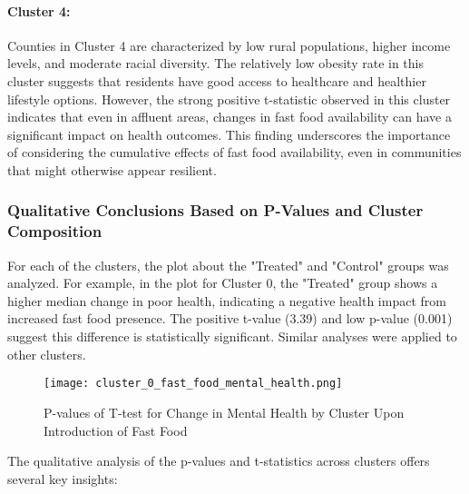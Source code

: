 \documentclass[letterpaper, 11pt]{report}
\begin{document}
\paragraph{Cluster 4:} 
Counties in Cluster 4 are characterized by low rural populations, higher income levels, and moderate racial diversity. The relatively low obesity rate in this cluster suggests that residents have good access to healthcare and healthier lifestyle options. However, the strong positive t-statistic observed in this cluster indicates that even in affluent areas, changes in fast food availability can have a significant impact on health outcomes. This finding underscores the importance of considering the cumulative effects of fast food availability, even in communities that might otherwise appear resilient.

\subsubsection{Qualitative Conclusions Based on P-Values and Cluster Composition}

For each of the clusters, the plot about the "Treated" and "Control" groups was analyzed. For example, in the plot for Cluster 0, the "Treated" group shows a higher median change in poor health, indicating a negative health impact from increased fast food presence. The positive t-value (3.39) and low p-value (0.001) suggest this difference is statistically significant. Similar analyses were applied to other clusters.

\begin{figure}[h!]
    \centering
    \texttt{[image: cluster\_0\_fast\_food\_mental\_health.png]}
    \caption{P-values of T-test for Change in Mental Health by Cluster Upon Introduction of Fast Food}
    \label{fig:mental_health_pvalues}
\end{figure}

The qualitative analysis of the p-values and t-statistics across clusters offers several key insights:
\end{document}
